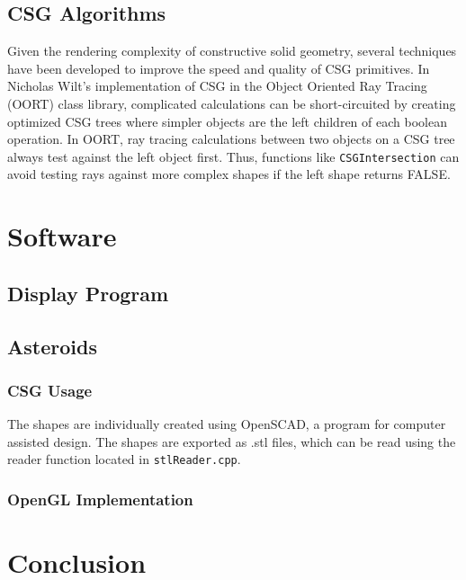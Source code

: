 \documentclass[12pt]{article}
\begin{document}
\subsection{CSG Algorithms}
\indent Given the rendering complexity of constructive solid geometry, several techniques have been developed to improve the speed and quality of CSG primitives. In Nicholas Wilt's implementation of CSG in the Object Oriented Ray Tracing (OORT) class library, complicated calculations can be short-circuited by creating optimized CSG trees where simpler objects are the left children of each boolean operation. In OORT, ray tracing calculations between two objects on a CSG tree always test against the left object first. Thus, functions like \texttt{CSGIntersection} can avoid testing rays against more complex shapes if the left shape returns FALSE\cite{raytrace}.
\section{Software}
\subsection{Display Program}
\subsection{Asteroids}
\subsubsection{CSG Usage}
The shapes are individually created using OpenSCAD, a program for computer assisted design. The shapes are exported as .stl files, which can be read using the reader function located in \texttt{stlReader.cpp}.
\subsubsection{OpenGL Implementation}
\section{Conclusion}
\end{document}
